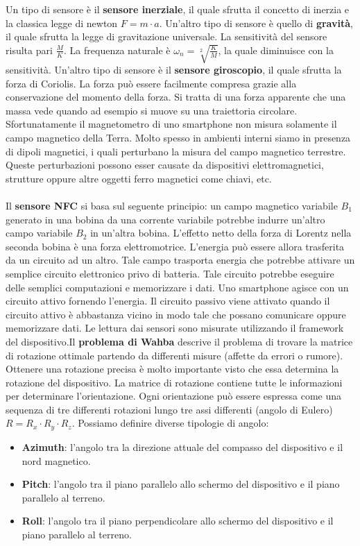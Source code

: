 Un tipo di sensore è il \textbf{sensore inerziale}, il quale sfrutta il concetto di inerzia e la classica legge di newton $F = m\cdot a$. Un'altro tipo di sensore è quello di \textbf{gravità}, il quale sfrutta la legge di gravitazione universale. La sensitività del sensore risulta pari $\frac{M}{K}$. La frequenza naturale è $\omega_n = \sqrt[2]{\frac{K}{M}}$, la quale diminuisce con la sensitività. Un'altro tipo di sensore è il \textbf{sensore giroscopio}, il quale sfrutta la forza di Coriolis. La forza può essere facilmente compresa grazie alla conservazione del momento della forza. Si tratta di una forza apparente che una massa vede quando ad esempio si muove su una traiettoria circolare. Sfortunatamente il magnetometro di uno smartphone non misura solamente il campo magnetico della Terra. Molto spesso in ambienti interni siamo in presenza di dipoli magnetici, i quali perturbano la misura del campo magnetico terrestre. Queste perturbazioni possono esser causate da dispositivi elettromagnetici, strutture oppure altre oggetti ferro magnetici come chiavi, etc.\\\\Il \textbf{sensore NFC} si basa sul seguente principio: un campo magnetico variabile $B_1$ generato in una bobina da una corrente variabile potrebbe indurre un'altro campo variabile $B_2$ in un'altra bobina. L'effetto netto della forza di Lorentz nella seconda bobina è una forza elettromotrice. L'energia può essere allora trasferita da un circuito ad un altro. Tale campo trasporta energia che potrebbe attivare un semplice circuito elettronico privo di batteria. Tale circuito potrebbe eseguire delle semplici computazioni e memorizzare i dati. Uno smartphone agisce con un circuito attivo fornendo l'energia. Il circuito passivo viene attivato quando il circuito attivo è abbastanza vicino in modo tale che possano comunicare oppure memorizzare dati. Le lettura dai sensori sono misurate utilizzando il framework del dispositivo.Il \textbf{problema di Wahba} descrive il problema di trovare la matrice di rotazione ottimale partendo da differenti misure (affette da errori o rumore). Ottenere una rotazione precisa è molto importante visto che essa determina la rotazione del dispositivo. La matrice di rotazione contiene tutte le informazioni per determinare l'orientazione. Ogni orientazione può essere espressa come una sequenza di tre differenti rotazioni lungo tre assi differenti (angolo di Eulero) $R = R_x \cdot R_y \cdot R_z$. Possiamo definire diverse tipologie di angolo:
\begin{itemize}
\item \textbf{Azimuth}: l'angolo tra la direzione attuale del compasso del dispositivo e il nord magnetico.
\item \textbf{Pitch}: l'angolo tra il piano parallelo allo schermo del dispositivo e il piano parallelo al terreno.
\item \textbf{Roll}: l'angolo tra il piano perpendicolare allo schermo del dispositivo e il piano parallelo al terreno.
\end{itemize}
